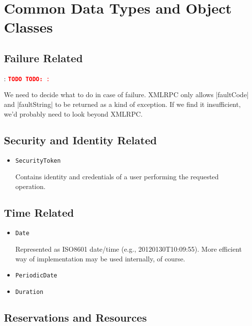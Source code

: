 \documentclass[a4paper]{report}
\newcommand{\APIcmd}[1]{\item \lstinline[style=myinline]!#1!}
\newenvironment{APIdef}{\begin{itemize}}{\end{itemize}}
\newcommand{\TODO}[1]{%
\def\empty{}%
\def\prvniparametr{#1}%
\ifx\prvniparametr\empty%
\begingroup\tt\textcolor{red}{\noindent\textbf{TODO}}\endgroup
\else%
\begingroup\tt\textcolor{red}{\noindent\textbf{TODO:}\ #1}\endgroup
\fi%
}
\begin{document}
\chapter{Common Data Types and Object Classes}

\section{Failure Related}

\TODO{:}
We need to decide what to do in case of failure. XMLRPC only allows |faultCode| and |faultString| to be returned as a kind of exception. If we find it insufficient, we'd probably need to look beyond XMLRPC.

\section{Security and Identity Related}

\begin{APIdef}

\APIcmd{SecurityToken}

Contains identity and credentials of a user performing the requested operation.

\end{APIdef}


\section{Time Related}

\begin{APIdef}

\APIcmd{Date}

Represented as ISO8601 date/time (e.g., 20120130T10:09:55). More efficient way of implementation may be used internally, of course.

\APIcmd{PeriodicDate}

\APIcmd{Duration}

\end{APIdef}


\section{Reservations and Resources}
\end{document}
